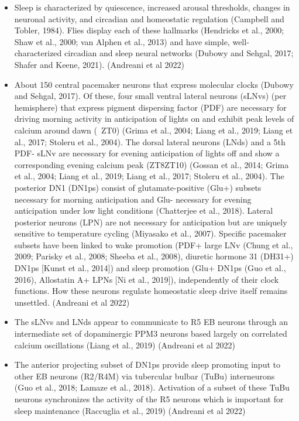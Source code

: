 \documentclass[11pt]{article}
\begin{document}
\begin{itemize}
    \item Sleep is characterized by quiescence, increased arousal thresholds, changes in neuronal activity, and circadian and homeostatic regulation (Campbell and Tobler, 1984). Flies display each of these hallmarks (Hendricks et al., 2000; Shaw et al., 2000; van Alphen et al., 2013) and have simple, well-characterized circadian and sleep neural networks (Dubowy and Sehgal, 2017; Shafer and Keene, 2021).
    \parencite{andreaniCircadianProgrammingEllipsoid2022} (Andreani et al 2022)

    \item About 150 central pacemaker neurons that express molecular clocks (Dubowy and Sehgal, 2017). Of these,
    four small ventral lateral neurons (sLNvs) (per hemisphere) that express pigment dispersing factor (PDF) are
    necessary for driving morning activity in anticipation of lights on and exhibit peak levels of calcium around
    dawn (~ZT0) (Grima et al., 2004; Liang et al., 2019; Liang et al., 2017; Stoleru et al., 2004).
    The dorsal lateral neurons (LNds) and a 5th PDF- sLNv are necessary for evening anticipation of lights off and
    show a corresponding evening calcium peak (ZT8ZT10)
    (Gossan et al., 2014; Grima et al., 2004; Liang et al., 2019; Liang et al., 2017; Stoleru et al., 2004).
    The posterior DN1 (DN1ps) consist of glutamate-positive (Glu+) subsets necessary for morning anticipation
    and Glu- necessary for evening anticipation under low light conditions (Chatterjee et al., 2018).
    Lateral posterior neurons (LPN) are not necessary for anticipation but are uniquely sensitive to temperature cycling
    (Miyasako et al., 2007). Specific pacemaker subsets have been linked to wake promotion
    (PDF+ large LNv (Chung et al., 2009; Parisky et al., 2008; Sheeba et al., 2008), diuretic hormone 31 (DH31+)
    DN1ps [Kunst et al., 2014]) and sleep promotion (Glu+ DN1ps (Guo et al., 2016),
    Allostatin A+ LPNs [Ni et al., 2019]), independently of their clock functions.
    How these neurons regulate homeostatic sleep drive itself remains unsettled.
    \parencite{andreaniCircadianProgrammingEllipsoid2022} (Andreani et al 2022)

    \item The sLNvs and LNds appear to communicate to R5 EB neurons through an intermediate set of dopaminergic PPM3 neurons based largely on correlated calcium oscillations (Liang et al., 2019)
    \parencite{andreaniCircadianProgrammingEllipsoid2022} (Andreani et al 2022)

    \item The anterior projecting subset of DN1ps provide sleep promoting input to other EB neurons (R2/R4M) via tubercular bulbar (TuBu) interneurons (Guo et al., 2018; Lamaze et al., 2018). Activation of a subset of these TuBu neurons synchronizes the activity of the R5 neurons which is important for sleep maintenance (Raccuglia et al., 2019)
    \parencite{andreaniCircadianProgrammingEllipsoid2022} (Andreani et al 2022)


\end{itemize}
\end{document}
